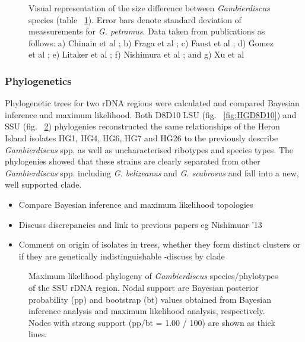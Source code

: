\documentclass[12pt]{article}
\begin{document}
\FloatBarrier 
\begin{figure} 
\caption{Visual representation of the size difference between \emph{Gambierdiscus} species (table ~\ref{fig:SizeGraph}). Error bars denote standard deviation of meassurements for \emph{G. petramus}. Data taken from publications as follows: a) Chinain et al \cite{chinain1999morphology}; b) Fraga et al \cite{fraga2014genus}; c) Faust et al \cite{faust1995observation}; d) Gomez et al \cite{gomez2015fukuyoa}; e) Litaker et al \cite{litaker2009taxonomy}; f) Nishimura et al \cite{nishimura2014morphology}; and g) Xu et al \cite{xu2014distribution}} 
\label{fig:SizeGraph}
\end{figure} 
\FloatBarrier 

\subsubsection{Phylogenetics}

Phylogenetic trees for two rDNA regions were calculated and compared Bayesian inference and maximum likelihood. Both D8D10 LSU (fig. ~\ref{fig:HGD8D10}) and SSU (fig. ~\ref{fig:HGSSU}) phylogenies reconstructed the same relationships of the Heron Island isolates HG1, HG4, HG6, HG7 and HG26 to the previously describe \emph{Gambierdiscus} spp. as well as uncharacterised ribotypes and species types. The phylogenies showed that these strains are clearly separated from other \emph{Gambierdiscus} spp. including \emph{G. belizeanus} and \emph{G. scabrosus} and fall into a new, well supported clade.\\

\begin{itemize}
\item Compare Bayesian inference and maximum likelihood topologies
\item Discuss discrepancies and link to previous papers eg Nishimuar '13
\item Comment on origin of isolates in trees, whether they form distinct clusters or if they are genetically indistinguishable
-discuss by clade
\end{itemize}
\FloatBarrier 

\begin{figure} 
\caption{Maximum likelihood phylogeny of \textit{Gambierdiscus} species/phylotypes of the SSU rDNA region. Nodal support are Bayesian posterior probability (pp) and bootstrap (bt) values obtained from Bayesian inference analysis and maximum likelihood analysis, respectively. Nodes with strong support (pp/bt = 1.00 / 100) are shown as thick lines.}
\label{fig:HGSSU} 
\end{figure} 
\FloatBarrier 
\end{document}
